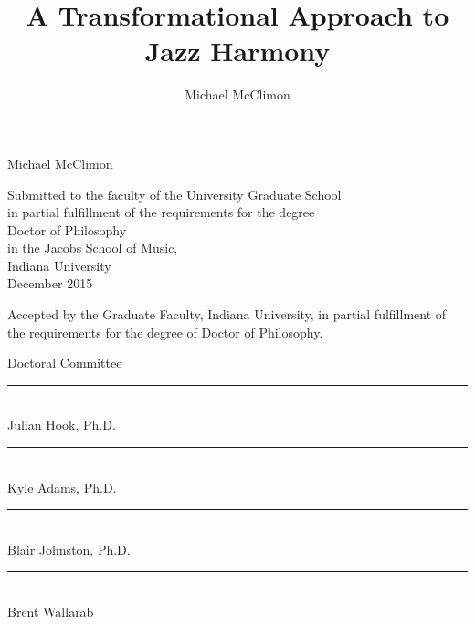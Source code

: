
\title{A Transformational Approach to Jazz Harmony}
\author{Michael McClimon}
\date{}
\makeatletter \let\Title\@title \makeatother


\begin{center}
  \singlespacing
  \thispagestyle{empty}

  \vspace*{\fill}
  \keepthetitle
  {
    \MakeUppercase{\Title}
  }

  \vspace{\baselineskip}
  Michael McClimon

  \vspace{4\baselineskip}

  Submitted to the faculty of the University Graduate School \\
  in partial fulfillment of the requirements for the degree \\
  Doctor of Philosophy \\
  in the Jacobs School of Music, \\
  Indiana University \\
  December 2015

  \vspace{\fill}
\end{center}
\cleardoublepage

\singlespacing
\begin{center}
  Accepted by the Graduate Faculty, Indiana University, in partial fulfillment
  of the requirements for the degree of Doctor of Philosophy.
\end{center}

{\flushleft
  \vspace{\baselineskip}
  Doctoral Committee
}

{\flushright

\vspace{5em}
\rule{20em}{0.5pt} \\ Julian Hook, Ph.D.

\vspace{5em}
\rule{20em}{0.5pt} \\ Kyle Adams, Ph.D.

\vspace{5em}
\rule{20em}{0.5pt} \\ Blair Johnston, Ph.D.

\vspace{5em}
\rule{20em}{0.5pt} \\ Brent Wallarab

}

